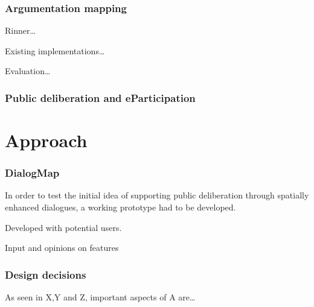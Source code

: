 \documentclass{sigchi}
\begin{document}
\subsubsection{Argumentation mapping}
Rinner\cite{Rinner_ArgumentationMaps}\dots

Existing implementations\dots

Evaluation\dots
\subsubsection{Public deliberation and eParticipation}


\section{Approach}

\subsubsection{DialogMap}

In order to test the initial idea of supporting public deliberation through spatially enhanced dialogues, a working prototype had to be developed.

Developed with potential users.

Input and opinions on features



\subsubsection{Design decisions}

As seen in X,Y and Z, important aspects of A are\dots
\end{document}
